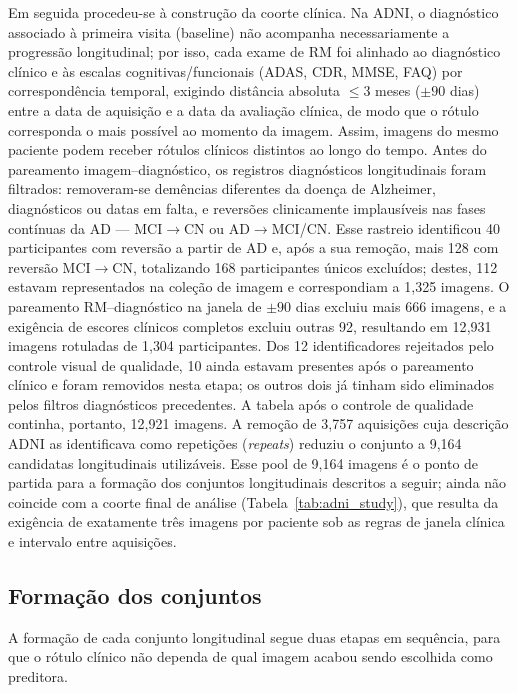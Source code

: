 \documentclass[review]{elsarticle}
\begin{document}
	Em seguida procedeu-se à construção da coorte clínica.
	Na ADNI, o diagnóstico associado à primeira visita (baseline) não acompanha necessariamente a progressão longitudinal; por isso, cada exame de RM foi alinhado ao diagnóstico clínico e às escalas cognitivas/funcionais (ADAS, CDR, MMSE, FAQ) por correspondência temporal, exigindo distância absoluta $\leq 3$ meses ($\pm 90$ dias) entre a data de aquisição e a data da avaliação clínica, de modo que o rótulo corresponda o mais possível ao momento da imagem.
	Assim, imagens do mesmo paciente podem receber rótulos clínicos distintos ao longo do tempo.
	Antes do pareamento imagem--diagnóstico, os registros diagnósticos longitudinais foram filtrados: removeram-se demências diferentes da doença de Alzheimer, diagnósticos ou datas em falta, e reversões clinicamente implausíveis nas fases contínuas da AD --- MCI$\rightarrow$CN ou AD$\rightarrow$MCI/CN.
	Esse rastreio identificou 40 participantes com reversão a partir de AD e, após a sua remoção, mais 128 com reversão MCI$\rightarrow$CN, totalizando 168 participantes únicos excluídos; destes, 112 estavam representados na coleção de imagem e correspondiam a 1{,}325 imagens.
	O pareamento RM--diagnóstico na janela de $\pm 90$ dias excluiu mais 666 imagens, e a exigência de escores clínicos completos excluiu outras 92, resultando em 12{,}931 imagens rotuladas de 1{,}304 participantes.
	Dos 12 identificadores rejeitados pelo controle visual de qualidade, 10 ainda estavam presentes após o pareamento clínico e foram removidos nesta etapa; os outros dois já tinham sido eliminados pelos filtros diagnósticos precedentes.
	A tabela após o controle de qualidade continha, portanto, 12{,}921 imagens.
	A remoção de 3{,}757 aquisições cuja descrição ADNI as identificava como repetições (\emph{repeats}) reduziu o conjunto a 9{,}164 candidatas longitudinais utilizáveis.
	Esse pool de 9{,}164 imagens é o ponto de partida para a formação dos conjuntos longitudinais descritos a seguir; ainda não coincide com a coorte final de análise (Tabela~\ref{tab:adni_study}), que resulta da exigência de exatamente três imagens por paciente sob as regras de janela clínica e intervalo entre aquisições.
		

\subsection{Formação dos conjuntos}\label{subsec:formacao}

	A formação de cada conjunto longitudinal segue duas etapas em sequência, para que o rótulo clínico não dependa de qual imagem acabou sendo escolhida como preditora.
	
\end{document}

